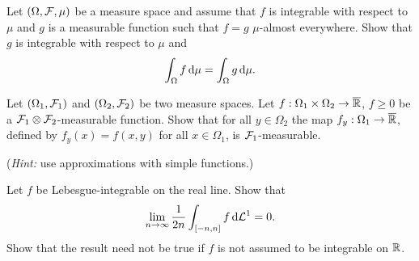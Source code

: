 \begin{problem} Let $(\Omega,\mathcal F,\mu)$ be a measure space and assume that $f$ is integrable with respect to $\mu$ and $g$ is a measurable function such that $f = g$ $\mu$-almost everywhere. Show that $g$ is integrable with respect to $\mu$ and 
    \begin{equation*}
        \int_\Omega f\, \mathrm{d} \mu =  \int_\Omega g\, \mathrm{d} \mu.
    \end{equation*}
\end{problem}

\begin{problem}
    
\end{problem}

\begin{problem}
    Let $(\Omega_1,\mathcal F_1)$ and $(\Omega_2,\mathcal F_2)$ be two measure spaces. Let $f:\Omega_1\times\Omega_2\to \overline{\mathbb R}$, $f\geq 0$ be a $\mathcal F_1\otimes \mathcal F_2$-measurable function. Show that for all $y\in \Omega_2$ the map $f_y : \Omega_1\to \overline{\mathbb R}$, defined by $f_y(x) = f(x,y)$ for all $x\in \Omega_1$, is $\mathcal F_1$-measurable.

    \noindent (\emph{Hint:} use approximations with simple functions.)
\end{problem}

\begin{problem}
    Let $f$ be Lebesgue-integrable on the real line. Show that
    \begin{equation*}
        \lim_{n\to\infty} \frac{1}{2 n} \int_{[-n,n]} f \,\mathrm{d}\mathcal L^1 = 0.
    \end{equation*}
    Show that the result need not be true if $f$ is not assumed to be integrable on $\mathbb R$.
\end{problem}